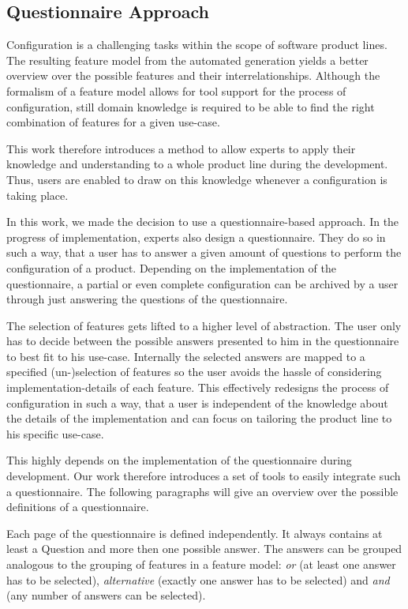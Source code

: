 \subsection{Questionnaire Approach}
Configuration is a challenging tasks within the scope of software product lines. The resulting feature model from the automated generation yields a better overview over the possible features and their interrelationships. Although the formalism of a feature model allows for tool support for the process of configuration, still domain knowledge is required to be able to find the right combination of features for a given use-case.

This work therefore introduces a method to allow experts to apply their knowledge and understanding to a whole product line during the development. Thus, users are enabled to draw on this knowledge whenever a configuration is taking place.

In this work, we made the decision to use a questionnaire-based approach. In the progress of implementation, experts also design a questionnaire. They do so in such a way, that a user has to answer a given amount of questions to perform the configuration of a product. Depending on the implementation of the questionnaire, a partial or even complete configuration can be archived by a user through just answering the questions of the questionnaire.

The selection of features gets lifted to a higher level of abstraction. The user only has to decide between the possible answers presented to him in the questionnaire to best fit to his use-case. Internally the selected answers are mapped to a specified (un-)selection of features so the user avoids the hassle of considering implementation-details of each feature. This effectively redesigns the process of configuration in such a way, that a user is independent of the knowledge about the details of the implementation and can focus on tailoring the product line to his specific use-case.

This highly depends on the implementation of the questionnaire during development. Our work therefore introduces a set of tools to easily integrate such a questionnaire. The following paragraphs will give an overview over the possible definitions of a questionnaire.

Each page of the questionnaire is defined independently. It always contains at least a Question and more then one possible answer. The answers can be grouped analogous to the grouping of features in a feature model: \textit{or} (at least one answer has to be selected), \textit{alternative} (exactly one answer has to be selected) and \textit{and} (any number of answers can be selected).

